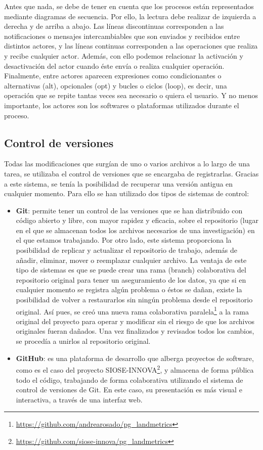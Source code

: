 Antes que nada, se debe de tener en cuenta que los procesos están representados mediante diagramas de secuencia. Por ello, la lectura debe realizar de izquierda a derecha y de arriba a abajo. Las líneas discontinuas corresponden a las notificaciones o mensajes intercambiables que son enviados y recibidos entre distintos actores, y las líneas continuas corresponden a las operaciones que realiza y recibe cualquier actor. Además, con ello podemos relacionar la activación y desactivación del actor cuando éste envía o realiza cualquier operación. Finalmente, entre actores aparecen expresiones como condicionantes o alternativas (alt), opcionales (opt) y bucles o ciclos (loop), es decir, una operación que se repite tantas veces sea necesario o quiera el usuario. Y no menos importante, los actores son los softwares o plataformas utilizados durante el proceso.

\subsection{Control de versiones}
Todas las modificaciones que surgían de uno o varios archivos a lo largo de una tarea, se utilizaba el control de versiones que se encargaba de registrarlas. Gracias a este sistema, se tenía la posibilidad de recuperar una versión antigua en cualquier momento. Para ello se han utilizado dos tipos de sistemas de control:
\begin{itemize}
\item\textbf{Git}: permite tener un control de las versiones que se han distribuido con código abierto y libre, con mayor rapidez y eficacia, sobre el repositorio (lugar en el que se almacenan todos los archivos necesarios de una investigación) en el que estamos trabajando. Por otro lado, este sistema proporciona la posibilidad de replicar y actualizar el repositorio de trabajo, además de añadir, eliminar, mover o reemplazar cualquier archivo. La ventaja de este tipo de sistemas es que se puede crear una rama (branch) colaborativa del repositorio original para tener un aseguramiento de los datos, ya que si en cualquier momento se registra algún problema o éstos se dañan, existe la posibilidad de volver a restaurarlos sin ningún problema desde el repositorio original. Así pues, se creó una nueva rama colaborativa paralela\footnote{\url{https://github.com/andrearosado/pg_landmetrics}} a la rama original del proyecto para operar y modificar sin el riesgo de que los archivos originales fueran dañados. Una vez finalizados y revisados todos los cambios, se procedía a unirlos al repositorio original.
\item\textbf{GitHub}: es una plataforma de desarrollo que alberga proyectos de software, como es el caso del proyecto SIOSE-INNOVA\footnote{\url{https://github.com/siose-innova/pg_landmetrics}}, y almacena de forma pública todo el código, trabajando de forma colaborativa utilizando el sistema de control de versiones de Git. En este caso, su presentación es más visual e interactiva, a través de una interfaz web.
\end{itemize}

